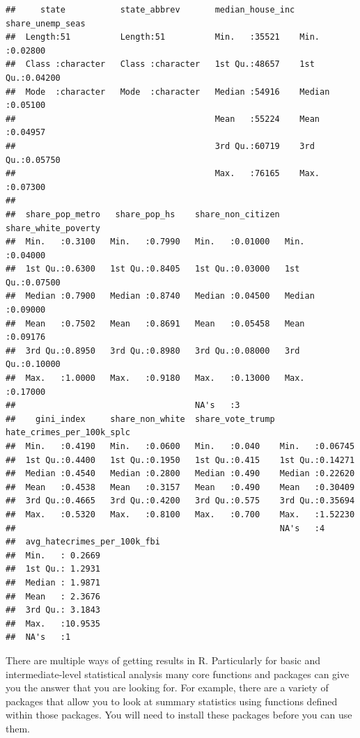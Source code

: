 \documentclass[
]{book}
\begin{document}
\begin{verbatim}
##     state           state_abbrev       median_house_inc share_unemp_seas 
##  Length:51          Length:51          Min.   :35521    Min.   :0.02800  
##  Class :character   Class :character   1st Qu.:48657    1st Qu.:0.04200  
##  Mode  :character   Mode  :character   Median :54916    Median :0.05100  
##                                        Mean   :55224    Mean   :0.04957  
##                                        3rd Qu.:60719    3rd Qu.:0.05750  
##                                        Max.   :76165    Max.   :0.07300  
##                                                                          
##  share_pop_metro   share_pop_hs    share_non_citizen share_white_poverty
##  Min.   :0.3100   Min.   :0.7990   Min.   :0.01000   Min.   :0.04000    
##  1st Qu.:0.6300   1st Qu.:0.8405   1st Qu.:0.03000   1st Qu.:0.07500    
##  Median :0.7900   Median :0.8740   Median :0.04500   Median :0.09000    
##  Mean   :0.7502   Mean   :0.8691   Mean   :0.05458   Mean   :0.09176    
##  3rd Qu.:0.8950   3rd Qu.:0.8980   3rd Qu.:0.08000   3rd Qu.:0.10000    
##  Max.   :1.0000   Max.   :0.9180   Max.   :0.13000   Max.   :0.17000    
##                                    NA's   :3                            
##    gini_index     share_non_white  share_vote_trump hate_crimes_per_100k_splc
##  Min.   :0.4190   Min.   :0.0600   Min.   :0.040    Min.   :0.06745          
##  1st Qu.:0.4400   1st Qu.:0.1950   1st Qu.:0.415    1st Qu.:0.14271          
##  Median :0.4540   Median :0.2800   Median :0.490    Median :0.22620          
##  Mean   :0.4538   Mean   :0.3157   Mean   :0.490    Mean   :0.30409          
##  3rd Qu.:0.4665   3rd Qu.:0.4200   3rd Qu.:0.575    3rd Qu.:0.35694          
##  Max.   :0.5320   Max.   :0.8100   Max.   :0.700    Max.   :1.52230          
##                                                     NA's   :4                
##  avg_hatecrimes_per_100k_fbi
##  Min.   : 0.2669            
##  1st Qu.: 1.2931            
##  Median : 1.9871            
##  Mean   : 2.3676            
##  3rd Qu.: 3.1843            
##  Max.   :10.9535            
##  NA's   :1
\end{verbatim}

There are multiple ways of getting results in R. Particularly for basic and intermediate-level statistical analysis many core functions and packages can give you the answer that you are looking for. For example, there are a variety of packages that allow you to look at summary statistics using functions defined within those packages. You will need to install these packages before you can use them.
\end{document}

